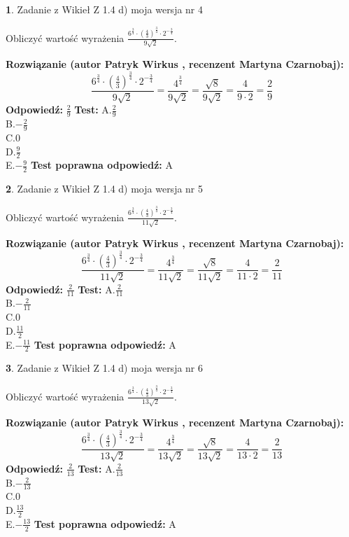 \documentclass[12pt, a4paper]{article}
\theoremstyle{definition} %
\newtheorem{zad}{}
\newcommand{\zadStart}[1]{\begin{zad}#1\newline}
\newcommand{\zadStop}{\end{zad}}
\newcommand{\rozwStart}[2]{\noindent \textbf{Rozwiązanie (autor #1 , recenzent #2): }\newline}
\newcommand{\rozwStop}{\newline}
\newcommand{\odpStart}{\noindent \textbf{Odpowiedź:}\newline}
\newcommand{\odpStop}{\newline}
\newcommand{\testStart}{\noindent \textbf{Test:}\newline}
\newcommand{\testStop}{\newline}
\newcommand{\kluczStart}{\noindent \textbf{Test poprawna odpowiedź:}\newline}
\newcommand{\kluczStop}{\newline}
\begin{document}
\zadStart{Zadanie z Wikieł Z 1.4 d) moja wersja nr 4}

Obliczyć wartość wyrażenia $\frac{6^{\frac{3}{4}}\cdot (\frac{4}{3})^{\frac{3}{4}}\cdot 2^{-\frac{3}{4}}}{9\sqrt{2}}$.
\zadStop
\rozwStart{Patryk Wirkus}{Martyna Czarnobaj}
$$\frac{6^{\frac{3}{4}}\cdot (\frac{4}{3})^{\frac{3}{4}}\cdot 2^{-\frac{3}{4}}}{9\sqrt{2}} = \frac{4^{\frac{3}{4}}}{9\sqrt{2}} = \frac{\sqrt{8}}{9\sqrt{2}} = \frac{4}{9\cdot 2} = \frac{2}{9}$$
\rozwStop
\odpStart
$\frac{2}{9}$
\odpStop
\testStart
A.$\frac{2}{9}$\\ B.$-\frac{2}{9}$\\ C.$0$\\ D.$\frac{9}{2}$\\ E.$-\frac{9}{2}$
\testStop
\kluczStart
A
\kluczStop



\zadStart{Zadanie z Wikieł Z 1.4 d) moja wersja nr 5}

Obliczyć wartość wyrażenia $\frac{6^{\frac{3}{4}}\cdot (\frac{4}{3})^{\frac{3}{4}}\cdot 2^{-\frac{3}{4}}}{11\sqrt{2}}$.
\zadStop
\rozwStart{Patryk Wirkus}{Martyna Czarnobaj}
$$\frac{6^{\frac{3}{4}}\cdot (\frac{4}{3})^{\frac{3}{4}}\cdot 2^{-\frac{3}{4}}}{11\sqrt{2}} = \frac{4^{\frac{3}{4}}}{11\sqrt{2}} = \frac{\sqrt{8}}{11\sqrt{2}} = \frac{4}{11\cdot 2} = \frac{2}{11}$$
\rozwStop
\odpStart
$\frac{2}{11}$
\odpStop
\testStart
A.$\frac{2}{11}$\\ B.$-\frac{2}{11}$\\ C.$0$\\ D.$\frac{11}{2}$\\ E.$-\frac{11}{2}$
\testStop
\kluczStart
A
\kluczStop



\zadStart{Zadanie z Wikieł Z 1.4 d) moja wersja nr 6}

Obliczyć wartość wyrażenia $\frac{6^{\frac{3}{4}}\cdot (\frac{4}{3})^{\frac{3}{4}}\cdot 2^{-\frac{3}{4}}}{13\sqrt{2}}$.
\zadStop
\rozwStart{Patryk Wirkus}{Martyna Czarnobaj}
$$\frac{6^{\frac{3}{4}}\cdot (\frac{4}{3})^{\frac{3}{4}}\cdot 2^{-\frac{3}{4}}}{13\sqrt{2}} = \frac{4^{\frac{3}{4}}}{13\sqrt{2}} = \frac{\sqrt{8}}{13\sqrt{2}} = \frac{4}{13\cdot 2} = \frac{2}{13}$$
\rozwStop
\odpStart
$\frac{2}{13}$
\odpStop
\testStart
A.$\frac{2}{13}$\\ B.$-\frac{2}{13}$\\ C.$0$\\ D.$\frac{13}{2}$\\ E.$-\frac{13}{2}$
\testStop
\kluczStart
A
\kluczStop
\end{document}
